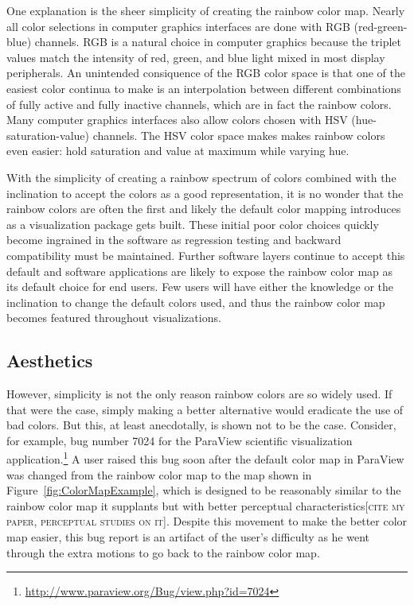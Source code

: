 \documentclass[letterpaper,twocolumn,fleqn]{article}
\newcommand{\fix}[1]{{\color{red}\textsc{[#1]}}}
\begin{document}
\noindent
One explanation is the sheer simplicity of creating the rainbow color map.
Nearly all color selections in computer graphics interfaces are done with
RGB (red-green-blue) channels. RGB is a natural choice in computer graphics
because the triplet values match the intensity of red, green, and blue
light mixed in most display peripherals. An unintended consiquence of the
RGB color space is that one of the easiest color continua to make is an
interpolation between different combinations of fully active and fully
inactive channels, which are in fact the rainbow colors. Many computer
graphics interfaces also allow colors chosen with HSV
(hue-saturation-value) channels. The HSV color space makes makes rainbow
colors even easier: hold saturation and value at maximum while varying hue.

With the simplicity of creating a rainbow spectrum of colors combined with
the inclination to accept the colors as a good representation, it is no
wonder that the rainbow colors are often the first and likely the default
color mapping introduces as a visualization package gets built. These
initial poor color choices quickly become ingrained in the software as
regression testing and backward compatibility must be maintained. Further
software layers continue to accept this default and software applications
are likely to expose the rainbow color map as its default choice for end
users. Few users will have either the knowledge or the inclination to
change the default colors used, and thus the rainbow color map becomes
featured throughout visualizations.

\subsection{Aesthetics}

\noindent
However, simplicity is not the only reason rainbow colors are so widely
used. If that were the case, simply making a better alternative would
eradicate the use of bad colors. But this, at least anecdotally, is shown
not to be the case. Consider, for example, bug number 7024 for the ParaView
scientific visualization
application.\footnote{\url{http://www.paraview.org/Bug/view.php?id=7024}} A
user raised this bug soon after the default color map in ParaView was
changed from the rainbow color map to the map shown in
Figure~\ref{fig:ColorMapExample}, which is designed to be reasonably
similar to the rainbow color map it supplants but with better perceptual
characteristics\fix{cite my paper, perceptual studies on it}. Despite this
movement to make the better color map easier, this bug report is an
artifact of the user's difficulty as he went through the extra motions to
go back to the rainbow color map.
\end{document}
